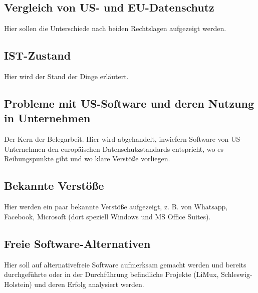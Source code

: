 \subsection{Vergleich von US- und EU-Datenschutz}
    Hier sollen die Unterschiede nach beiden Rechtslagen aufgezeigt werden.

\subsection{IST-Zustand}
    Hier wird der Stand der Dinge erläutert.

\subsection{Probleme mit US-Software und deren Nutzung in Unternehmen}
    Der Kern der Belegarbeit. Hier wird abgehandelt, inwiefern Software von US-Unternehmen den europäischen Datenschutzstandards entspricht, wo es Reibungspunkte gibt und wo klare Verstöße vorliegen.

\subsection{Bekannte Verstöße}
    Hier werden ein paar bekannte Verstöße aufgezeigt, z. B. von Whatsapp, Facebook, Microsoft (dort speziell Windows und MS Office Suites).

\subsection{Freie Software-Alternativen}
    Hier soll auf alternativefreie Software aufmerksam gemacht werden und bereits durchgeführte oder in der Durchführung befindliche Projekte (LiMux, Schleswig-Holstein) und deren Erfolg analysiert werden.